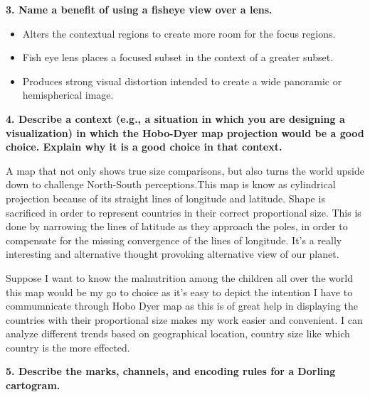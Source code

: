 \documentclass{article}[12pt]
\begin{document}
\vspace{2ex}\noindent
{\bf 3. Name a benefit of using a fisheye view over a lens. }

{ 
    \begin{itemize}
    \item   Alters the contextual regions to create more room for the focus regions.
	\item   Fish eye lens places a focused subset in the context of a greater subset.
    \item	Produces strong visual distortion intended to create a wide panoramic or hemispherical image.
    \end{itemize}
}




\vspace{2ex}\noindent
{ \bf 4. Describe a context (e.g., a situation in which you are designing a visualization) in which the Hobo-Dyer map projection would be a good choice. Explain why it is a good choice in that context. }

{
	A map that not only shows true size comparisons, but also turns the world upside down to challenge North-South perceptions.This map is know as cylindrical projection because of its straight lines of longitude and latitude. Shape is sacrificed in order to represent countries in their correct proportional size. This is done by narrowing the lines of latitude as they approach the poles, in order to compensate for the missing convergence of the lines of longitude. It’s a really interesting and alternative thought provoking alternative view of our planet.


	Suppose I want to know the malnutrition among the children all over the world this map would be my go to choice as it's easy to depict the intention I have to commumnicate through Hobo Dyer map as this is of great help in displaying the countries with their proportional size makes my work easier and convenient. I can analyze different trends based on geographical location, country size like which country is the more effected.
	  
}

\vspace{2ex}\noindent
{ \bf 5. Describe the marks, channels, and encoding rules for a Dorling cartogram.  }
\end{document}
